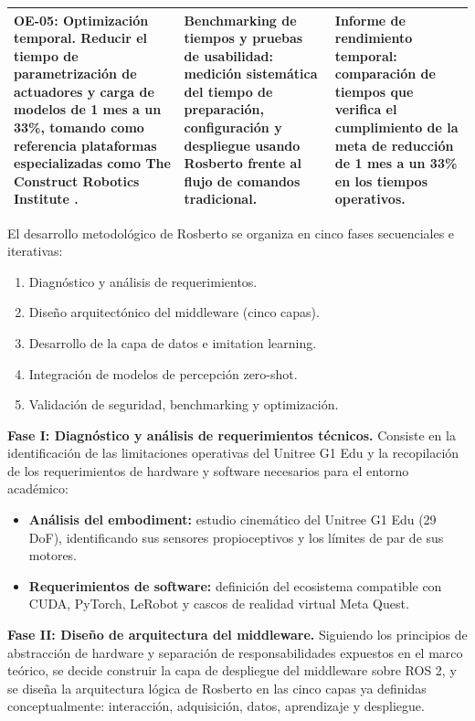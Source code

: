 \documentclass[stu,12pt,floatsintext]{apa7}
\begin{document}
\begin{longtable}{|p{3.6cm}|p{5.4cm}|p{5.4cm}|}
\textbf{OE-05: Optimización temporal.} Reducir el tiempo de parametrización de actuadores y carga de modelos de 1 mes a un 33\%, tomando como referencia plataformas especializadas como The Construct Robotics Institute \parencite{theconstruct2026humanoid}. &
\textbf{Benchmarking de tiempos y pruebas de usabilidad:} medición sistemática del tiempo de preparación, configuración y despliegue usando Rosberto frente al flujo de comandos tradicional. &
\textbf{Informe de rendimiento temporal:} comparación de tiempos que verifica el cumplimiento de la meta de reducción de 1 mes a un 33\% en los tiempos operativos. \\
\hline
\end{longtable}

El desarrollo metodológico de Rosberto se organiza en cinco fases secuenciales e iterativas:

\begin{enumerate}
    \item Diagnóstico y análisis de requerimientos.
    \item Diseño arquitectónico del middleware (cinco capas).
    \item Desarrollo de la capa de datos e imitation learning.
    \item Integración de modelos de percepción zero-shot.
    \item Validación de seguridad, benchmarking y optimización.
\end{enumerate}

\textbf{Fase I: Diagnóstico y análisis de requerimientos técnicos.} Consiste en la identificación de las limitaciones operativas del Unitree G1 Edu y la recopilación de los requerimientos de hardware y software necesarios para el entorno académico:
\begin{itemize}
    \item \textbf{Análisis del embodiment:} estudio cinemático del Unitree G1 Edu (29 DoF), identificando sus sensores propioceptivos y los límites de par de sus motores.
    \item \textbf{Requerimientos de software:} definición del ecosistema compatible con CUDA, PyTorch, LeRobot y cascos de realidad virtual Meta Quest.
\end{itemize}

\textbf{Fase II: Diseño de arquitectura del middleware.} Siguiendo los principios de abstracción de hardware y separación de responsabilidades expuestos en el marco teórico, se decide construir la capa de despliegue del middleware sobre ROS 2, y se diseña la arquitectura lógica de Rosberto en las cinco capas ya definidas conceptualmente: interacción, adquisición, datos, aprendizaje y despliegue.
\end{document}
